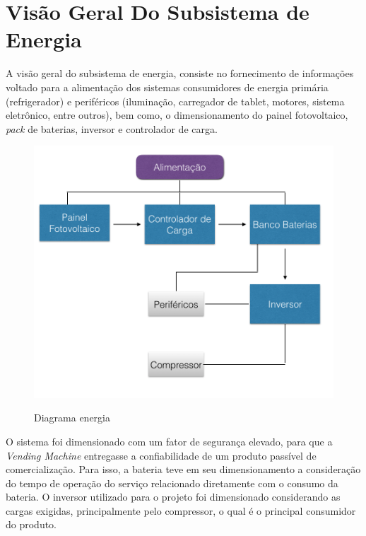 \newpage

\section{Visão Geral Do Subsistema de Energia}

	A visão geral do subsistema de energia, consiste no fornecimento de informações voltado para a alimentação dos sistemas consumidores de energia primária (refrigerador) e periféricos (iluminação, carregador de tablet, motores, sistema eletrônico, entre outros), bem como, o dimensionamento do painel fotovoltaico,  \textit{pack} de baterias, inversor e controlador de carga.

  \begin{figure}[H]
	\centering

    \includegraphics[scale=0.8]{figuras/diagrama_energia}
    \label{fig:diagrama_energia}
    \caption{Diagrama energia}
\end{figure}

	O sistema foi dimensionado com um fator de segurança elevado, para que a \textit{Vending Machine} entregasse a confiabilidade de um produto passível de comercialização. Para isso, a bateria teve em seu dimensionamento a consideração do tempo de operação do serviço relacionado diretamente com o consumo da bateria. O inversor utilizado para o projeto foi dimensionado considerando as cargas exigidas, principalmente pelo compressor, o qual é o principal consumidor do produto.
